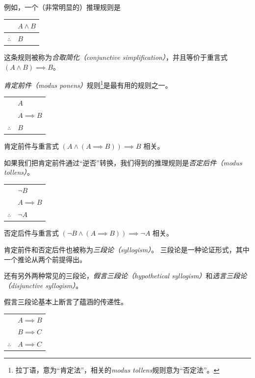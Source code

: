 例如，一个（非常明显的）推理规则是

\begin{center}
\begin{tabular}{cl}
 & $A \land B$ \\ \hline
$\therefore$ & $B$\\
\end{tabular}
\end{center}
  
\noindent 这条规则被称为\emph{合取简化（conjunctive simplification）}，并且等价于重言式 $(A \land B) \implies B$。

\emph{肯定前件（modus ponens）}规则\footnote{拉丁语，意为“肯定法”，相关的\emph{modus tollens}规则意为“否定法”。}是最有用的规则之一。

\begin{center}
\begin{tabular}{cl}
 & $A$ \\
 & $A \implies B$ \\ \hline
$\therefore$ & $B$ \\
\end{tabular}
\end{center}

肯定前件与重言式 $(A \land (A \implies B)) \implies B$ 相关。

如果我们把肯定前件通过“逆否”转换，我们得到的推理规则是\emph{否定后件（modus tollens）}。

\begin{center}
\begin{tabular}{cl}
 & ${\lnot}B$ \\
 & $A \implies B$ \\ \hline
$\therefore$ & ${\lnot}A$ \\
\end{tabular}
\end{center}

否定后件与重言式 $({\lnot}B \land (A \implies B)) \implies {\lnot}A$ 相关。

肯定前件和否定后件也被称为\emph{三段论（syllogism）}。
三段论是一种论证形式，其中一个推论从两个前提得出。

还有另外两种常见的三段论，\emph{假言三段论（hypothetical syllogism）}和\emph{选言三段论（disjunctive syllogism）}。

假言三段论基本上断言了蕴涵的传递性。

\begin{center}
\begin{tabular}{cl}
 & $A \implies B$ \\
 & $B \implies C$ \\ \hline
$\therefore$ & $A \implies C$ \\
\end{tabular}
\end{center}

